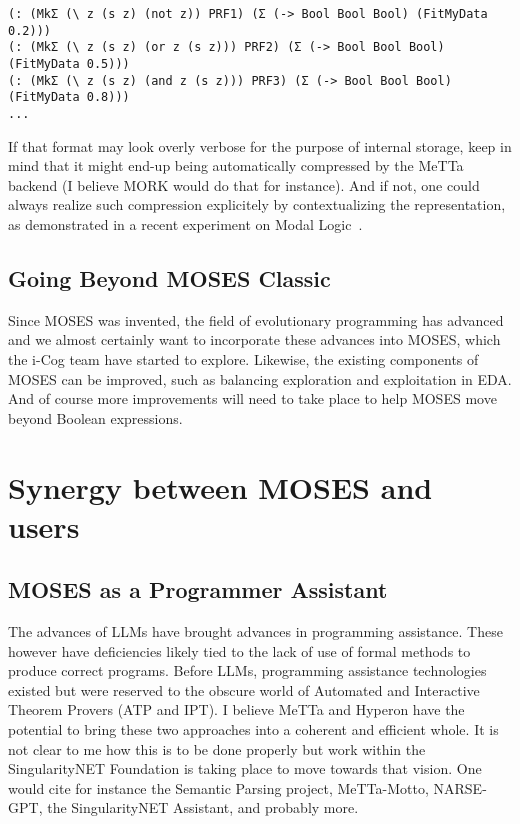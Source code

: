 \documentclass[]{report}
\begin{document}
\begin{footnotesize}
\begin{verbatim}
(: (MkΣ (\ z (s z) (not z)) PRF1) (Σ (-> Bool Bool Bool) (FitMyData 0.2)))
(: (MkΣ (\ z (s z) (or z (s z))) PRF2) (Σ (-> Bool Bool Bool) (FitMyData 0.5)))
(: (MkΣ (\ z (s z) (and z (s z))) PRF3) (Σ (-> Bool Bool Bool) (FitMyData 0.8)))
...
\end{verbatim}
\end{footnotesize}
If that format may look overly verbose for the purpose of internal
storage, keep in mind that it might end-up being automatically
compressed by the MeTTa backend (I believe MORK would do that for
instance).  And if not, one could always realize such compression
explicitely by contextualizing the representation, as demonstrated in
a recent experiment on Modal Logic~\cite{ModalLogic}.

\subsection{Going Beyond MOSES Classic}

Since MOSES was invented, the field of evolutionary programming has
advanced and we almost certainly want to incorporate these advances
into MOSES, which the i-Cog team have started to explore.  Likewise,
the existing components of MOSES can be improved, such as balancing
exploration and exploitation in EDA.  And of course more improvements
will need to take place to help MOSES move beyond Boolean expressions.

\section{Synergy between MOSES and users}

\subsection{MOSES as a Programmer Assistant}

The advances of LLMs have brought advances in programming assistance.
These however have deficiencies likely tied to the lack of use of
formal methods to produce correct programs.  Before LLMs, programming
assistance technologies existed but were reserved to the obscure world
of Automated and Interactive Theorem Provers (ATP and IPT).  I believe
MeTTa and Hyperon have the potential to bring these two approaches
into a coherent and efficient whole.  It is not clear to me how this
is to be done properly but work within the SingularityNET Foundation
is taking place to move towards that vision.  One would cite for
instance the Semantic Parsing project, MeTTa-Motto, NARSE-GPT, the
SingularityNET Assistant, and probably more.
\end{document}
